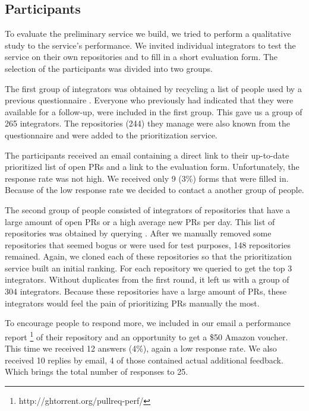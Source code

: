 \subsection{Participants}
To evaluate the preliminary service we build, we tried to perform a qualitative study to the service's performance.
We invited individual integrators to test the service on their own repositories and to fill in a short evaluation form.
The selection of the participants was divided into two groups.

The first group of integrators was obtained by recycling a list of people used by a previous questionnaire \cite{GZSD15}.
Everyone who previously had indicated that they were available for a follow-up, were included in the first group.
This gave us a group of 265 integrators.
The repositories (244) they manage were also known from the questionnaire and were added to the prioritization service.

The participants received an email containing a direct link to their up-to-date prioritized list of open PRs and a link to the evaluation form.
Unfortunately, the response rate was not high.
We received only 9 (3\%) forms that were filled in.
Because of the low response rate we decided to contact a another group of people.

The second group of people consisted of integrators of repositories that have a large amount of open PRs or a high average new PRs per day.
This list of repositories was obtained by querying \ghtorrent.
After we manually removed some repositories that seemed bogus or were used for test purposes, 148 repositories remained.
Again, we cloned each of these repositories so that the prioritization service built an initial ranking.
For each repository we queried \ghtorrent to get the top 3 integrators.
Without duplicates from the first round, it left us with a group of 304 integrators.
Because these repositories have a large amount of PRs, these integrators would feel the pain of prioritizing PRs manually the most.

To encourage people to respond more, we included in our email a performance report \footnote{http://ghtorrent.org/pullreq-perf/} of their repository and an opportunity to get a \$50 Amazon voucher.
This time we received 12 answers (4\%), again a low response rate.
We also received 10 replies by email, 4 of those contained actual additional feedback.
Which brings the total number of responses to 25.
